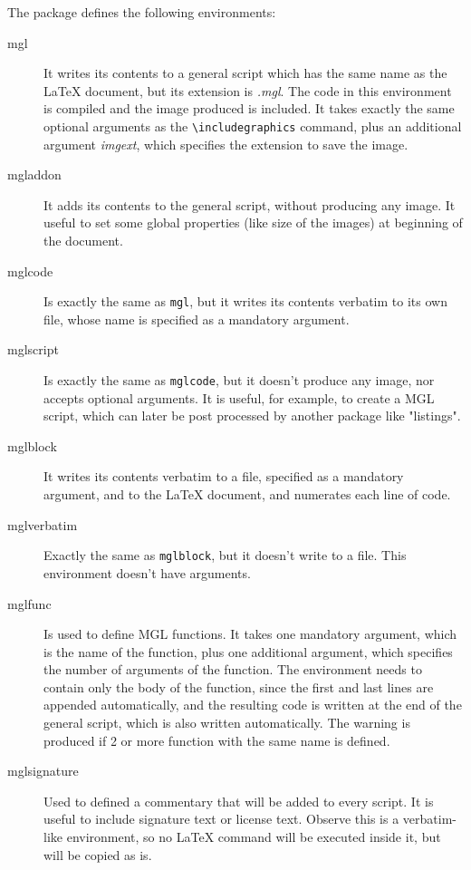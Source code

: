 \documentclass{article}
\begin{document}
The package defines the following environments:
\begin{description}
\item[mgl]
	It writes its contents to a general script which has the same name as the LaTeX document, but its extension is \emph{.mgl}. The code in this environment is compiled and the image produced is included. It takes exactly the same optional arguments as the \texttt{\textbackslash{}includegraphics} command, plus an additional argument \emph{imgext}, which specifies the extension to save the image.
\item[mgladdon]
	It adds its contents to the general script, without producing any image. It useful to set some global properties (like size of the images) at beginning of the document.
\item[mglcode]
	Is exactly the same as \texttt{mgl}, but it writes its contents verbatim to its own file, whose name is specified as a mandatory argument.
\item[mglscript]
	Is exactly the same as \texttt{mglcode}, but it doesn't produce any image, nor accepts optional arguments. It is useful, for example, to create a MGL script, which can later be post processed by another package like "listings".
\item[mglblock]
	It writes its contents verbatim to a file, specified as a mandatory argument, and to the LaTeX document, and numerates each line of code.

\item[mglverbatim]
	Exactly the same as \texttt{mglblock}, but it doesn't write to a file. This environment doesn't have arguments.
\item[mglfunc]
	Is used to define MGL functions. It takes one mandatory argument, which is the name of the function, plus one additional argument, which specifies the number of arguments of the function. The environment needs to contain only the body of the function, since the first and last lines are appended automatically, and the resulting code is written at the end of the general script, which is also written automatically. The warning is produced if 2 or more function with the same name is defined.
\item[mglsignature]
	Used to defined a commentary that will be added to every script. It is useful to include signature text or license text. Observe this is a verbatim-like environment, so no \LaTeX{} command will be executed inside it, but will be copied as is.


\end{description}
\end{document}
